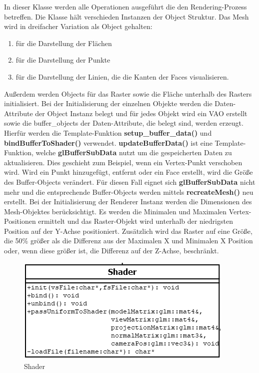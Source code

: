 	\noindent In dieser Klasse werden alle Operationen ausgeführt die den Rendering-Prozess betreffen. Die Klasse hält verschieden Instanzen der Object Struktur. Das Mesh wird in dreifacher Variation als Object gehalten:
	\begin{enumerate}
	\item für die Darstellung der Flächen
	\item für die Darstellung der Punkte
	\item für die Darstellung der Linien, die die Kanten der Faces visualisieren.
	\end{enumerate}
Außerdem werden Objects für das Raster sowie die Fläche unterhalb des Rasters initialisiert.\newline
Bei der Initialisierung der einzelnen Objekte werden die Daten-Attribute der Object Instanz belegt und für jedes Objekt wird ein VAO erstellt sowie die buffer\_objects der Daten-Attribute, die belegt sind, werden erzeugt. Hierfür werden die Template-Funktion \textbf{setup\_buffer\_data()} und \textbf{bindBufferToShader()} verwendet. \textbf{updateBufferData()} ist eine Template-Funktion, welche \textbf{glBufferSubData} nutzt um die gespeicherten Daten zu aktualisieren. Dies geschieht zum Beispiel, wenn ein Vertex-Punkt verschoben wird. Wird ein Punkt hinzugefügt, entfernt oder ein Face erstellt, wird die Größe des Buffer-Objects verändert. Für diesen Fall eignet sich \textbf{glBufferSubData} nicht mehr und die entsprechende Buffer-Objects werden mittels \textbf{recreateMesh()} neu erstellt.\newline
Bei der Initialisierung der Renderer Instanz werden die Dimensionen des Mesh-Objektes berücksichtigt. Es werden die Minimalen und Maximalen Vertex-Positionen ermittelt und das Raster-Objekt wird unterhalb der niedrigsten Position auf der Y-Achse positioniert. Zusätzlich wird das Raster auf eine Größe, die 50\% größer als die Differenz aus der Maximalen X und Minimalen X Position oder, wenn diese größer ist, die Differenz auf der Z-Achse, beschränkt.

	\begin{figure}[H]
	\centering
	\includegraphics[width=0.7\linewidth]{shader.png}
	\caption{Shader}
	\label{fig6}
	\end{figure}

